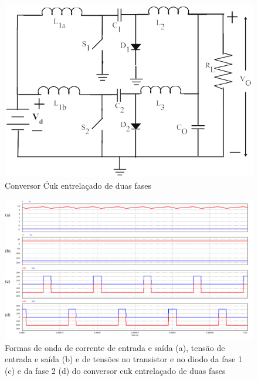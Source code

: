 \documentclass[
	12pt,				%
	openany,
	onseside,
	a4paper,			%
	english,			%
	french,				%
	spanish,			%
	brazil,				%
	]{abntex2}
\begin{document}
\begin{figure}[htbp]
	\begin{center}
		\includegraphics[width=0.55 \linewidth]{interv_cuk_circuit}
		\caption{Conversor Ćuk entrelaçado de duas fases \cite{JOSEPH_2015_Intervealed_CUK}}
		\label{fig:interv_cuk_conv} 
	\end{center}
\end{figure}


\begin{figure}[htbp]
	\captionsetup{justification=centering}
	\centering
		\includegraphics[width= \linewidth]{interv_cuk_signal_details}
		\caption{Formas de onda de corrente de entrada e saída (a), tensão de entrada e saída (b) e de tensões no transistor e no diodo da fase 1 (c) e da fase 2 (d) do conversor cuk entrelaçado de duas fases}
		\label{fig:interv_cuk_In_Out} 
\end{figure}
\end{document}
